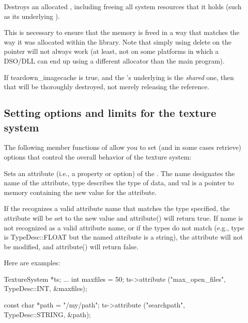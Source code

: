 Destroys an allocated \TextureSystem, including freeing all system
resources that it holds (such as its underlying \ImageCache).

This is necessary to ensure that the memory is freed in a way that
matches the way it was allocated within the library.  Note that simply
using {\cf delete} on the pointer will not always work (at least,
not on some platforms in which a DSO/DLL can end up using a different
allocator than the main program).

If {\cf teardown_imagecache} is {\cf true}, and the \TextureSystem's
underlying \ImageCache is the \emph{shared} one, then that \ImageCache will
be thoroughly destroyed, not merely releasing the reference. \apiend

\subsection{Setting options and limits for the texture system}
\label{sec:texturesys:api:options}

The following member functions of \TextureSystem allow you to set
(and in some cases retrieve) options that control the overall
behavior of the texture system:


Sets an attribute (i.e., a property or option) of the \TextureSystem.
The {\cf name} designates the name of the attribute, {\cf type}
describes the type of data, and {\cf val} is a pointer to memory 
containing the new value for the attribute.

If the \TextureSystem recognizes a valid attribute name that matches the
type specified, the attribute will be set to the new value and {\cf
  attribute()} will return {\cf true}.  If {\cf name} is not recognized
as a valid attribute name, or if the types do not match (e.g., {\cf
  type} is {\cf TypeDesc::FLOAT} but the named attribute is a string),
the attribute will not be modified, and {\cf attribute()} will return
{\cf false}.

Here are examples:

\begin{code}
      TextureSystem *ts; 
      ...
      int maxfiles = 50;
      ts->attribute ("max_open_files", TypeDesc::INT, &maxfiles);

      const char *path = "/my/path";
      ts->attribute ("searchpath", TypeDesc::STRING, &path);
\end{code}

